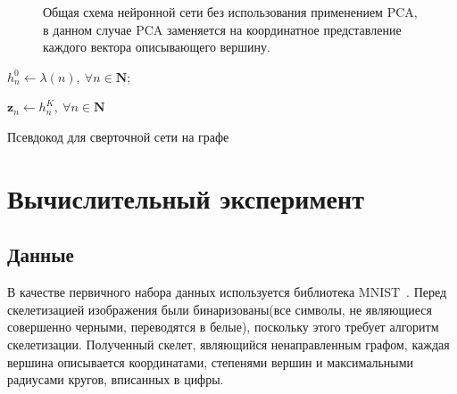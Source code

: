 \documentclass[12pt, twoside]{article}
\begin{document}
\begin{figure}[h]
\caption{Общая схема нейронной сети без использования применением PCA, в данном случае PCA заменяется на координатное представление каждого вектора описывающего вершину.}
\label{my_g2v_next_csheme}
\end{figure}
\begin{algorithm}[H]
\SetAlgoLined %


$h^0_n \leftarrow \lambda(n), \ \forall n \in  \mathbf{N}$;

$\mathbf{z}_n \leftarrow h^K_n, \ \forall n \in \mathbf{N}$
\caption{Псевдокод для сверточной сети на графе}
\label{GCNN_alg}
\end{algorithm}

\section{Вычислительный эксперимент}
\subsection{Данные}
В качестве первичного набора данных используется библиотека MNIST~\cite{mnist_explanation}. Перед скелетизацией изображения были бинаризованы(все символы, не являющиеся совершенно черными, переводятся в белые), поскольку этого требует алгоритм скелетизации. Полученный скелет, являющийся ненаправленным графом, каждая вершина описывается координатами, степенями вершин и максимальными радиусами кругов, вписанных в цифры.
\end{document}
